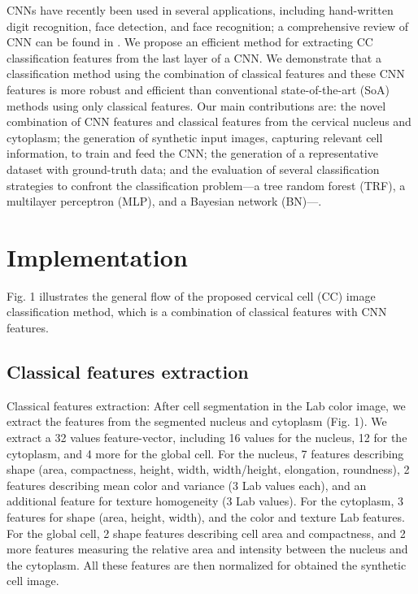 \documentclass{bmcart}
\begin{document}
CNNs have recently been used in several applications, including hand-written digit recognition, face detection, and face recognition; a comprehensive review of CNN can be found in \cite{13}. We propose an efficient method for extracting CC classification features from the last layer of a CNN. We demonstrate that a classification method using the combination of classical features and these CNN features is more robust and efficient than conventional state-of-the-art (SoA) methods using only classical features. Our main contributions are: the novel combination of CNN features and classical features from the cervical nucleus and cytoplasm; the generation of synthetic input images, capturing relevant cell information, to train and feed the CNN; the generation of a representative dataset with ground-truth data; and the evaluation of several classification strategies to confront the classification problem---a tree random forest (TRF), a multilayer perceptron (MLP), and a Bayesian network (BN)---. 

\section*{Implementation}
Fig. 1 illustrates the general flow of the proposed cervical cell (CC) image classification method, which is a combination of classical features with CNN features. 

\subsection*{Classical features extraction}
Classical features extraction: After cell segmentation in the Lab color image, we extract the features from the segmented nucleus and cytoplasm (Fig. 1). We extract a 32 values feature-vector, including 16 values for the nucleus, 12 for the cytoplasm, and 4 more for the global cell. For the nucleus, 7 features describing shape (area, compactness, height, width, width/height, elongation, roundness), 2 features describing mean color and variance (3 Lab values each), and an additional feature for texture homogeneity (3 Lab values). For the cytoplasm, 3 features for shape (area, height, width), and the color and texture Lab features. For the global cell, 2 shape features describing cell area and compactness, and 2 more features measuring the relative area and intensity between the nucleus and the cytoplasm. All these features are then normalized for obtained the synthetic cell image.
\end{document}
